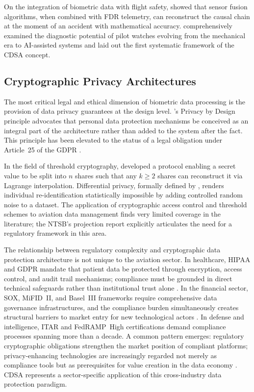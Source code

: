 \documentclass[12pt,a4paper]{article}
\begin{document}
On the integration of biometric data with flight safety, \citet{ratti2021} showed that sensor
fusion algorithms, when combined with FDR telemetry, can reconstruct the causal chain at the
moment of an accident with mathematical accuracy. \citet{cantekin2025a} comprehensively examined
the diagnostic potential of pilot watches evolving from the mechanical era to AI-assisted systems
and laid out the first systematic framework of the CDSA concept.

\subsection{Cryptographic Privacy Architectures}

The most critical legal and ethical dimension of biometric data processing is the provision
of data privacy guarantees at the design level. \citet{cavoukian2009}'s Privacy by Design
principle advocates that personal data protection mechanisms be conceived as an integral part
of the architecture rather than added to the system after the fact. This principle has been
elevated to the status of a legal obligation under Article~25 of the GDPR \citep{gdpr2016}.

In the field of threshold cryptography, \citet{shamir1979} developed a protocol enabling a
secret value to be split into $n$ shares such that any $k \geq 2$ shares can reconstruct it
via Lagrange interpolation. Differential privacy, formally defined by \citet{dwork2014}, renders
individual re-identification statistically impossible by adding controlled random noise to a dataset.
The application of cryptographic access control and threshold schemes to aviation data management
finds very limited coverage in the literature; the NTSB's \citeyearpar{ntsb2023} projection report
explicitly articulates the need for a regulatory framework in this area.

The relationship between regulatory complexity and cryptographic data protection architecture is
not unique to the aviation sector. In healthcare, HIPAA and GDPR mandate that patient data be
protected through encryption, access control, and audit trail mechanisms; compliance must be
grounded in direct technical safeguards rather than institutional trust alone \citep{conduah2025}.
In the financial sector, SOX, MiFID~II, and Basel~III frameworks require comprehensive data
governance infrastructures, and the compliance burden simultaneously creates structural barriers
to market entry for new technological actors \citep{mcnulty2023}. In defense and intelligence,
ITAR and FedRAMP~High certifications demand compliance processes spanning more than a decade.
A common pattern emerges: regulatory cryptographic obligations strengthen the market position
of compliant platforms; privacy-enhancing technologies are increasingly regarded not merely
as compliance tools but as prerequisites for value creation in the data economy \citep{nitrd2022}.
CDSA represents a sector-specific application of this cross-industry data protection paradigm.
\end{document}

